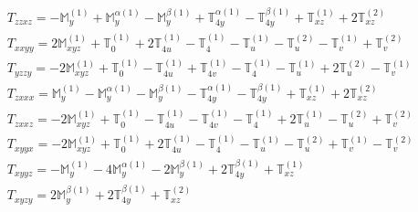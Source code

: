 \documentclass[fleqn,8pt,landscape]{jsarticle}
\begin{document}
\begin{align*}
& T_{zzxz} = - \mathbb{M}_{y}^{(1)} + \mathbb{M}_{y}^{\alpha(1)} - \mathbb{M}_{y}^{\beta(1)} + \mathbb{T}_{4y}^{\alpha(1)} - \mathbb{T}_{4y}^{\beta(1)} + \mathbb{T}_{xz}^{(1)} + 2 \mathbb{T}_{xz}^{(2)} \\
& T_{xxyy} = 2 \mathbb{M}_{xyz}^{(1)} + \mathbb{T}_{0}^{(1)} + 2 \mathbb{T}_{4u}^{(1)} - \mathbb{T}_{4}^{(1)} - \mathbb{T}_{u}^{(1)} - \mathbb{T}_{u}^{(2)} - \mathbb{T}_{v}^{(1)} + \mathbb{T}_{v}^{(2)} \\
& T_{yzzy} = - 2 \mathbb{M}_{xyz}^{(1)} + \mathbb{T}_{0}^{(1)} - \mathbb{T}_{4u}^{(1)} + \mathbb{T}_{4v}^{(1)} - \mathbb{T}_{4}^{(1)} - \mathbb{T}_{u}^{(1)} + 2 \mathbb{T}_{u}^{(2)} - \mathbb{T}_{v}^{(1)} \\
& T_{zxxx} = \mathbb{M}_{y}^{(1)} - \mathbb{M}_{y}^{\alpha(1)} - \mathbb{M}_{y}^{\beta(1)} - \mathbb{T}_{4y}^{\alpha(1)} - \mathbb{T}_{4y}^{\beta(1)} + \mathbb{T}_{xz}^{(1)} + 2 \mathbb{T}_{xz}^{(2)} \\
& T_{zxxz} = - 2 \mathbb{M}_{xyz}^{(1)} + \mathbb{T}_{0}^{(1)} - \mathbb{T}_{4u}^{(1)} - \mathbb{T}_{4v}^{(1)} - \mathbb{T}_{4}^{(1)} + 2 \mathbb{T}_{u}^{(1)} - \mathbb{T}_{u}^{(2)} + \mathbb{T}_{v}^{(2)} \\
& T_{xyyx} = - 2 \mathbb{M}_{xyz}^{(1)} + \mathbb{T}_{0}^{(1)} + 2 \mathbb{T}_{4u}^{(1)} - \mathbb{T}_{4}^{(1)} - \mathbb{T}_{u}^{(1)} - \mathbb{T}_{u}^{(2)} + \mathbb{T}_{v}^{(1)} - \mathbb{T}_{v}^{(2)} \\
& T_{xyyz} = - \mathbb{M}_{y}^{(1)} - 4 \mathbb{M}_{y}^{\alpha(1)} - 2 \mathbb{M}_{y}^{\beta(1)} + 2 \mathbb{T}_{4y}^{\beta(1)} + \mathbb{T}_{xz}^{(1)} \\
& T_{xyzy} = 2 \mathbb{M}_{y}^{\beta(1)} + 2 \mathbb{T}_{4y}^{\beta(1)} + \mathbb{T}_{xz}^{(2)}
\end{align*}
\end{document}
